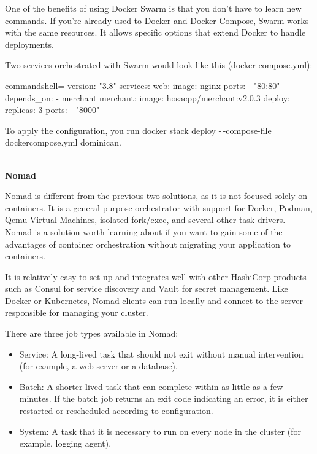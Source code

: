 One of the benefits of using Docker Swarm is that you don't have to learn new commands. If you're already used to Docker and Docker Compose, Swarm works with the same resources. It allows specific options that extend Docker to handle deployments.

Two services orchestrated with Swarm would look like this (docker-compose.yml):

\begin{tcblisting}{commandshell={}}
version: "3.8"
services:
  web:
    image: nginx
    ports:
      - "80:80"
    depends_on:
      - merchant
  merchant:
    image: hosacpp/merchant:v2.0.3
    deploy:
      replicas: 3
    ports:
      - "8000"
\end{tcblisting}

To apply the configuration, you run docker stack deploy -\,-compose-file dockercompose.yml dominican.

\hspace*{\fill} \\ %
\noindent
\textbf{Nomad}

Nomad is different from the previous two solutions, as it is not focused solely on containers. It is a general-purpose orchestrator with support for Docker, Podman, Qemu Virtual Machines, isolated fork/exec, and several other task drivers. Nomad is a solution worth learning about if you want to gain some of the advantages of container orchestration without migrating your application to containers.

It is relatively easy to set up and integrates well with other HashiCorp products such as Consul for service discovery and Vault for secret management. Like Docker or Kubernetes, Nomad clients can run locally and connect to the server responsible for managing your cluster.

There are three job types available in Nomad:

\begin{itemize}
\item 
Service: A long-lived task that should not exit without manual intervention (for example, a web server or a database).

\item 
Batch: A shorter-lived task that can complete within as little as a few minutes. If the batch job returns an exit code indicating an error, it is either restarted or rescheduled according to configuration.

\item 
System: A task that it is necessary to run on every node in the cluster (for example, logging agent).
\end{itemize}

